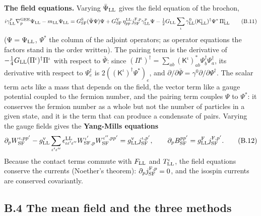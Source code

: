 \documentclass[
  10pt,
]{article}
\begin{document}
\textbf{The field equations.} Varying \(\bar\Psi_{\rm LL}\) gives the
field equation of the brochon,
\[i\gamma^p_{\rm LL}\nabla^{\rm GEE}_p\Psi_{\rm LL}-m_{\rm LL}\Psi_{\rm LL}=G^{\rm S}_{\rm SF}(\bar\Psi\Psi)\Psi+G^{\rm V}_{\rm SF}\,\eta^{\rm LL}_{pp}j^{{\rm F},p}_{\rm SF}\gamma^p_{\rm LL}\Psi-\tfrac12G_{\rm LL}\sum_\iota\gamma^0_{\rm LL}(\mathsf K^\iota_{\rm LL})^\dagger\Psi^*\,\Pi^\iota_{\rm LL}\tag{B.11}\]
(\(\Psi=\Psi_{\rm LL}\), \(\Psi^*\) the column of the adjoint operators;
as operator equations the factors stand in the order written). The
pairing term is the derivative of
\(-\tfrac14G_{\rm LL}(\Pi^\iota)^\dagger\Pi^\iota\) with respect to
\(\bar\Psi\): since
\((\Pi^\iota)^\dagger=\sum_{ab}(\mathsf K^\iota)^*_{ab}\Psi^\dagger_b\Psi^\dagger_a\),
its derivative with respect to \(\Psi^\dagger_e\) is
\(2((\mathsf K^\iota)^\dagger\Psi^*)_e\), and
\(\partial/\partial\bar\Psi=\gamma^0\partial/\partial\Psi^\dagger\). The
scalar term acts like a mass that depends on the field, the vector term
like a gauge potential coupled to the fermion number, and the pairing
term couples \(\Psi\) to \(\Psi^*\): it conserves the fermion number as
a whole but not the number of particles in a given state, and it is the
term that can produce a condensate of pairs. Varying the gauge fields
gives the \textbf{Yang-Mills equations}
\[\partial_pW^{\iota,pp'}_{\rm SF}-g^{\rm v}_{\rm LL}\sum_{\iota'\iota''}\epsilon^{\rm LL}_{\iota\iota'\iota''}W^{\iota'}_{{\rm SF},p}W^{\iota'',pp'}_{\rm SF}=g^{\rm v}_{\rm LL}j^{\iota,p'}_{\rm SF},\qquad\partial_pB^{pp'}_{\rm SF}=g^{\rm F}_{\rm LL}j^{{\rm F},p'}_{\rm SF}.\tag{B.12}\]
Because the contact terms commute with \(F_{\rm LL}\) and
\(T^\iota_{\rm LL}\), the field equations conserve the currents
(Noether's theorem): \(\partial_pj^{{\rm F},p}_{\rm SF}=0\), and the
isospin currents are conserved covariantly.

\hypertarget{b.4-the-mean-field-and-the-three-methods}{%
\subsection{B.4 The mean field and the three
methods}\label{b.4-the-mean-field-and-the-three-methods}}
\end{document}
